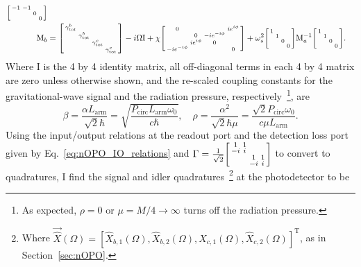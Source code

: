 \begin{align}
\begin{bsmallmatrix}
-1 & -1 &  &  \\
 &  & 0 &  \\
 &  &  & 0
\end{bsmallmatrix}\\
\text{M}_b&=\begin{bsmallmatrix}
\gamma^b_\mathrm{tot} &  &  &  \\
 & \gamma^b_\mathrm{tot} &  &  \\
 &  & \gamma^c_\mathrm{tot} &  \\
 &  &  & \gamma^c_\mathrm{tot} 
\end{bsmallmatrix}-i\Omega \text{I}+\chi \begin{bsmallmatrix}
0 &  &  & i e^{i\phi} \\
 & 0 & -i e^{-i\phi} &  \\
 & i e^{i\phi} & 0 &  \\
-i e^{-i\phi} &  &  & 0
\end{bsmallmatrix}+\omega_s^2\begin{bsmallmatrix}
1 &  &  &  \\
 & 1 &  &  \\
 &  & 0 &  \\
 &  &  & 0
\end{bsmallmatrix}\text{M}_a^{-1}\begin{bsmallmatrix}
1 &  &  &  \\
 & 1 &  &  \\
 &  & 0 &  \\
 &  &  & 0
\end{bsmallmatrix}.
\end{align}
Where $\text{I}$ is the 4 by 4 identity matrix, all off-diagonal terms in each 4 by 4 matrix are zero unless otherwise shown, and the re-scaled coupling constants for the gravitational-wave signal and the radiation pressure, respectively~\footnote{As expected, $\rho=0$ or $\mu=M/4\rightarrow\infty$ turns off the radiation pressure.}, are
\begin{equation}\label{eq:beta_and_rho}
\beta = \frac{\alpha L_\mathrm{arm}}{\sqrt{2}\hbar}=\sqrt{\frac{ P_\text{circ}L_\text{arm} \omega_0 }{c  \hbar}},\quad \rho = \frac{\alpha^2}{\sqrt{2}\hbar\mu}=\frac{\sqrt{2} P_\text{circ} \omega_0}{c \mu L_\text{arm}}.
\end{equation}
Using the input/output relations at the readout port and the detection loss port given by Eq.~\ref{eq:nOPO_IO_relations} and $\Gamma= \frac{1}{\sqrt2}\begin{bsmallmatrix}
1 & 1 &  &  \\
-i & i &  &  \\
 &  & 1 & 1 \\
 &  & -i & i
\end{bsmallmatrix}$ to convert to quadratures, I find the signal and idler quadratures~\footnote{Where $\vec{\hat X}(\Omega)=[\hat X_{b,1}(\Omega),\hat X_{b,2}(\Omega),\hat X_{c,1}(\Omega),\hat X_{c,2}(\Omega)]^\text{T}$, as in Section~\ref{sec:nOPO}.} at the photodetector to be

